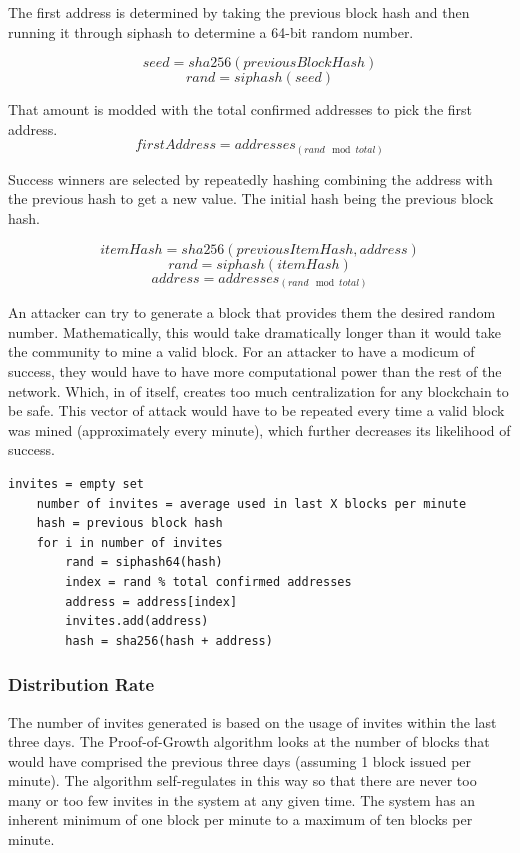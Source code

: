 \documentclass{article}
\begin{document}
The first address is determined by taking the previous block hash and then running
it through siphash \cite{siphash} to determine a 64-bit random number.

    $$seed = sha256(previousBlockHash)$$
    $$rand = siphash(seed)$$

That amount is modded with the total confirmed addresses to pick the first address.
    $$firstAddress = addresses_{(rand \mod total)}$$

Success winners are selected by repeatedly hashing combining the address with the
previous hash to get a new value. The initial hash being the previous block hash.

    $$itemHash = sha256(previousItemHash, address)$$
    $$rand = siphash(itemHash)$$
    $$address = addresses_{(rand \mod total)}$$

An attacker can try to generate a block that provides them the desired
random number. Mathematically, this would take dramatically longer than it would 
take the community to mine a valid block.  For an attacker to have a modicum of success, 
they would have to have more computational power than the rest of the network.  Which, 
in of itself, creates too much centralization for any blockchain to be safe.  
This vector of attack would have to be repeated every time a valid block was mined (approximately every minute),
which further decreases its likelihood of success.

\lstset{language=C}
\begin{lstlisting}[caption=Decentralized Invite Algorithm]
    invites = empty set
    number of invites = average used in last X blocks per minute
    hash = previous block hash
    for i in number of invites
        rand = siphash64(hash)
        index = rand % total confirmed addresses
        address = address[index]
        invites.add(address)
        hash = sha256(hash + address)

\end{lstlisting}

\subsubsection{Distribution Rate}

The number of invites generated is based on the usage of invites within the last three days.  
The Proof-of-Growth algorithm looks at the number of blocks that would have comprised the previous three days
(assuming 1 block issued per minute). The algorithm self-regulates in this way so that 
there are never too many or too few invites in the system at any given time.  The system 
has an inherent minimum of one block per minute to a maximum of ten blocks per minute.
\end{document}

